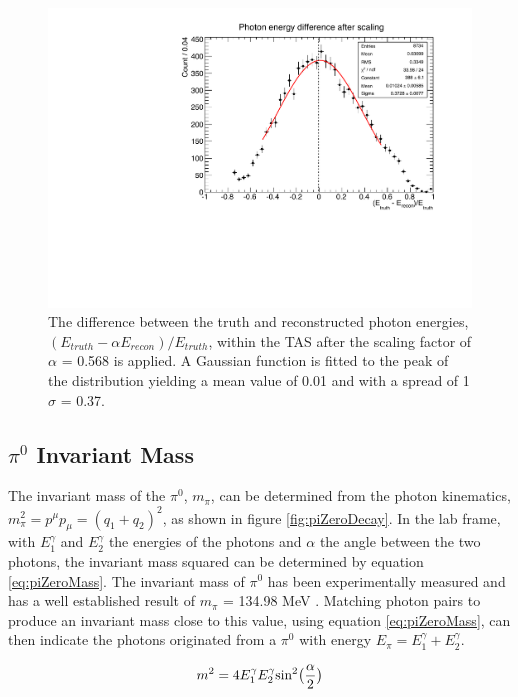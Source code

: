 \begin{figure}[htbp]
\begin{center}
  	\includegraphics[width=120mm]{Chapter4/figures/testPhoton_energy_diff_plot_scaled.pdf}
		\caption{The difference between the truth and reconstructed photon energies, $(E_{truth} - \alpha E_{recon})/E_{truth}$, within the TAS after the scaling factor of $\alpha$ = 0.568 is applied. A Gaussian function is fitted to the peak of the distribution yielding a mean value of 0.01 and with a spread of 1$\sigma$ = 0.37.}
	\label{fig:photonReconEnergyDiff}
\end{center}
\end{figure}

\subsection{$\pi^{0}$ Invariant Mass}
The invariant mass of the $\pi^{0}$, $m_{\pi}$, can be determined from the photon kinematics, $m^{2}_{\pi} = p^{\mu}p_{\mu} = (q_{1} + q_{2})^{2}$, as shown in figure \ref{fig:piZeroDecay}. In the lab frame, with $E^{\gamma}_{1}$ and $E^{\gamma}_{2}$ the energies of the photons and $\alpha$ the angle between the two photons, the invariant mass squared can be determined by equation \ref{eq:piZeroMass}. The invariant mass of $\pi^{0}$ has been experimentally measured and has a well established result of $m_{\pi}$ = 134.98 MeV \cite{pionDecayModes}. Matching photon pairs to produce an invariant mass close to this value, using equation \ref{eq:piZeroMass}, can then indicate the photons originated from a $\pi^{0}$ with energy $E_{\pi} = E^{\gamma}_{1} + E^{\gamma}_{2}$.

\begin{equation}
	m^{2} = 4E^{\gamma}_{1}E^{\gamma}_{2}\textnormal{sin}^{2}\big(\frac{\alpha}{2} \big)
	\label{eq:piZeroMass}
\end{equation}

